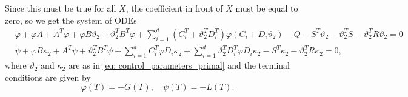 Since this must be true for all $X$, the coefficient in front of $X$ must be equal to zero, so we get the system of ODEs
\begin{align}
    &\dot{\varphi} + \varphi A + A^T \varphi + \varphi B \vartheta_2 + \vartheta_2^T B^T \varphi + \sum_{i=1}^d (C_i^T + \vartheta_2^T D_i^T) \varphi (C_i + D_i \vartheta_2) - Q - S^T \vartheta_2 - \vartheta_2^T S - \vartheta_2^T R \vartheta_2  = 0  \label{eq: primal_bsde_solution_1}\\
    &\dot{\psi} + \varphi B \kappa_2 + A^T \psi + \vartheta_2^T B^T \psi + \sum_{i=1}^d C_i^T \varphi D_i \kappa_2 + \sum_{i=1}^d \vartheta_2^T D_i^T \varphi D_i \kappa_2 - S^T \kappa_2 - \vartheta_2^T R \kappa_2 = 0, \label{eq: primal_bsde_solution_2}
\end{align}
where $\vartheta_2$ and $\kappa_2$ are as in \eqref{eq: control_parameters_primal} and the terminal conditions are given by
\begin{equation}
    \varphi(T) = - G(T), \quad \psi(T) = - L(T). \label{eq: primal_bsde_terminal_conds}
\end{equation}



